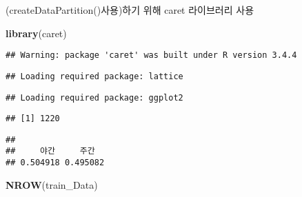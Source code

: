 \documentclass[]{article}
\newenvironment{Shaded}{\begin{snugshade}}{\end{snugshade}}
\newcommand{\KeywordTok}[1]{\textcolor[rgb]{0.13,0.29,0.53}{\textbf{#1}}}
\newcommand{\DataTypeTok}[1]{\textcolor[rgb]{0.13,0.29,0.53}{#1}}
\newcommand{\DecValTok}[1]{\textcolor[rgb]{0.00,0.00,0.81}{#1}}
\newcommand{\FloatTok}[1]{\textcolor[rgb]{0.00,0.00,0.81}{#1}}
\newcommand{\CommentTok}[1]{\textcolor[rgb]{0.56,0.35,0.01}{\textit{#1}}}
\newcommand{\OperatorTok}[1]{\textcolor[rgb]{0.81,0.36,0.00}{\textbf{#1}}}
\newcommand{\NormalTok}[1]{#1}
\begin{document}
(createDataPartition()사용)하기 위해 caret 라이브러리 사용

\begin{Shaded}
\begin{Highlighting}[]
\KeywordTok{library}\NormalTok{(caret)}
\end{Highlighting}
\end{Shaded}

\begin{verbatim}
## Warning: package 'caret' was built under R version 3.4.4
\end{verbatim}

\begin{verbatim}
## Loading required package: lattice
\end{verbatim}

\begin{verbatim}
## Loading required package: ggplot2
\end{verbatim}

\begin{Shaded}
\end{Shaded}

\begin{verbatim}
## [1] 1220
\end{verbatim}

\begin{Shaded}
\end{Shaded}

\begin{verbatim}
## 
##     야간     주간 
## 0.504918 0.495082
\end{verbatim}

\begin{Shaded}
\begin{Highlighting}[]
\KeywordTok{NROW}\NormalTok{(train_Data)}
\end{Highlighting}
\end{Shaded}
\end{document}
